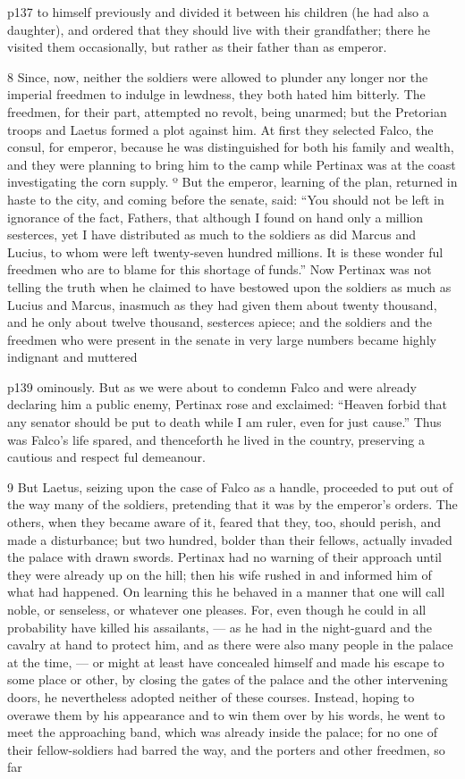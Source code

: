 p137 to himself previously and divided it between his children (he had also a daughter), and ordered that they should live with their grandfather; there he visited them occasionally, but rather as their father than as emperor.

8
Since, now, neither the soldiers were allowed to plunder any longer nor the imperial freedmen to indulge in lewdness, they both hated him bitterly. The freedmen, for their part, attempted no revolt, being unarmed; but the Pretorian troops and Laetus formed a plot against him. At first they selected Falco, the consul, for emperor, because he was distinguished for both his family and wealth, and they were planning to bring him to the camp while Pertinax was at the coast investigating the corn supply. º But the emperor, learning of the plan, returned in haste to the city, and coming before the senate, said: ``You should not be left in ignorance of the fact, Fathers, that although I found on hand only a million sesterces, yet I have distributed as much to the soldiers as did Marcus and Lucius, to whom were left twenty-seven hundred millions. It is these wonder ­ful freedmen who are to blame for this shortage of funds.'' Now Pertinax was not telling the truth when he claimed to have bestowed upon the soldiers as much as Lucius and Marcus, inasmuch as they had given them about twenty thousand, and he only about twelve thousand, sesterces apiece; and the soldiers and the freedmen who were present in the senate in very large numbers became highly indignant and muttered

p139 ominously. But as we were about to condemn Falco and were already declaring him a public enemy, Pertinax rose and exclaimed: ``Heaven forbid that any senator should be put to death while I am ruler, even for just cause.'' Thus was Falco's life spared, and thenceforth he lived in the country, preserving a cautious and respect ­ful demeanour.

9
But Laetus, seizing upon the case of Falco as a handle, proceeded to put out of the way many of the soldiers, pretending that it was by the emperor's orders. The others, when they became aware of it, feared that they, too, should perish, and made a disturbance; but two hundred, bolder than their fellows, actually invaded the palace with drawn swords. Pertinax had no warning of their approach until they were already up on the hill; then his wife rushed in and informed him of what had happened. On learning this he behaved in a manner that one will call noble, or senseless, or whatever one pleases. For, even though he could in all probability have killed his assailants, \texthebrew{—} as he had in the night-guard and the cavalry at hand to protect him, and as there were also many people in the palace at the time, \texthebrew{—} or might at least have concealed himself and made his escape to some place or other, by closing the gates of the palace and the other intervening doors, he nevertheless adopted neither of these courses. Instead, hoping to overawe them by his appearance and to win them over by his words, he went to meet the approaching band, which was already inside the palace; for no one of their fellow-soldiers had barred the way, and the porters and other freedmen, so far


